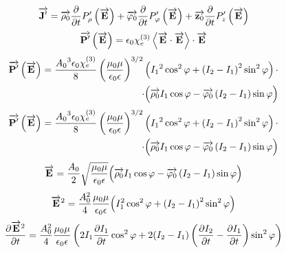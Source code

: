 \textcolor{blue}{ \begin{equation*} 
\overrightarrow{\mathbf J^\prime} = 
\overrightarrow{\mathbf \rho_0}    \frac{\partial }{\partial t} P_\rho^\prime    \left( \overrightarrow{\mathbf E} \right) + 
\overrightarrow{\mathbf \varphi_0} \frac{\partial }{\partial t} P_\varphi^\prime \left( \overrightarrow{\mathbf E} \right) + 
\overrightarrow{\mathbf z_0}       \frac{\partial }{\partial t} P_z^\prime       \left( \overrightarrow{\mathbf E} \right) 
\end{equation*} }
%
\textcolor{blue}{ \begin{equation*}
\overrightarrow{\mathbf P^\prime} \left( \overrightarrow{\mathbf E} \right) = \epsilon_0 \chi_e^{(3)} 
\left<  \overrightarrow{\mathbf E}  \cdot  \overrightarrow{\mathbf E}  \right> \cdot \overrightarrow{\mathbf E} 
\end{equation*} }
%
\textcolor{blue}{ \begin{equation*} \begin{aligned}
\overrightarrow{\mathbf P^\prime} \left( \overrightarrow{\mathbf E} \right) = 
\frac{ {A_0}^3 \epsilon_0 \chi_e^{(3)} }{ 8 } \left( \frac{\mu_0 \mu}
{\epsilon_0 \epsilon} \right)^{3/2} \left( {I_1}^2 \cos^2 \varphi + 
\left( I_2 - I_1 \right)^2 \sin^2 \varphi \right) \cdot \\ 
\cdot \Big( \overrightarrow{\mathbf \rho_0} I_1 \cos \varphi - 
\overrightarrow{\mathbf  \varphi_0 } \left( I_2 - I_1 \right) \sin \varphi \Big)
\end{aligned} \end{equation*} }
%
\textcolor{blue}{ \begin{equation*} \begin{aligned}
\overrightarrow{\mathbf P^\prime} \left( \overrightarrow{\mathbf E} \right) = 
\frac{ {A_0}^3 \epsilon_0 \chi_e^{(3)} }{ 8 } \left( \frac{\mu_0 \mu}
{\epsilon_0 \epsilon} \right)^{3/2} \left( {I_1}^2 \cos^2 \varphi + 
\left( I_2 - I_1 \right)^2 \sin^2 \varphi \right) \cdot \\ 
\cdot \Big( \overrightarrow{\mathbf \rho_0} I_1 \cos \varphi - 
\overrightarrow{\mathbf  \varphi_0 } \left( I_2 - I_1 \right) \sin \varphi \Big)
\end{aligned} \end{equation*} }
%
\textcolor{blue}{ \begin{equation*}
\overrightarrow{\mathbf E} = \frac{A_0}{2} \sqrt{\frac{\mu_0 \mu}{\epsilon_0 \epsilon}}
\Big( \overrightarrow{\mathbf \rho_0} I_1 \cos \varphi - 
\overrightarrow{\mathbf  \varphi_0 } \left( I_2 - I_1 \right) \sin \varphi \Big)
\end{equation*} }
%
\textcolor{blue}{ \begin{equation*} \begin{aligned}
\overrightarrow{\mathbf E}^2 = \frac{A_0^2}{4} \frac{\mu_0 \mu}{\epsilon_0 \epsilon}
\Big( I_1^2 \cos^2 \varphi + \left( I_2 - I_1 \right)^2 \sin^2 \varphi \Big)
\end{aligned} \end{equation*} }
%
\textcolor{blue}{ \begin{equation*} \begin{aligned}
\frac{\partial  \overrightarrow{\mathbf E}^2 }{\partial t} = \frac{A_0^2}{4} 
\frac{\mu_0 \mu}{\epsilon_0 \epsilon}
\left( 2 I_1 \frac{\partial I_1}{\partial t} \cos^2 \varphi + 
2 ( I_2 - I_1 ) \left( \frac{\partial I_2}{\partial t} - \frac{\partial I_1}{\partial t} \right) 
\sin^2 \varphi \right)
\end{aligned} \end{equation*} }

